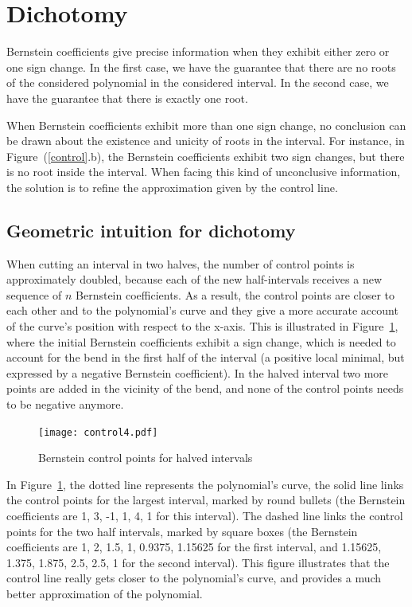 \documentclass{mscs}
\begin{document}
\section{Dichotomy}

\label{sec:dicho}
Bernstein coefficients give precise information when they exhibit
either zero or one sign change. In the first case, we have the
guarantee that there are no roots of the considered polynomial in the
considered interval. In the second case, we have the guarantee that
there is exactly one root.

When Bernstein coefficients exhibit more than one sign change, no
conclusion can be drawn about the existence and unicity of roots in the
interval.  For instance, in Figure~(\ref{control}.b), the Bernstein
coefficients exhibit two sign changes, but there is no root inside the
interval.  When facing this kind of unconclusive information, the solution
is to refine the approximation given by the control line.

\subsection{Geometric intuition for dichotomy}
\label{ssec:dichogeom}
When cutting an interval in two halves, the number of control points is
approximately doubled, because each of the new half-intervals receives a
new sequence of \(n\) Bernstein coefficients.  As a result, the control points
are closer to each other and to the polynomial's curve and they give a more
accurate account of the curve's position with respect to the x-axis.  This is
illustrated in Figure~\ref{dichotomy-curve}, where the initial Bernstein
coefficients exhibit a sign change, which is needed to account for the bend
in the first half of the interval (a positive local minimal, but expressed
by a negative Bernstein coefficient).  In the halved interval two more points
are added in the vicinity of the bend, and none of the control points needs
to be negative anymore.
\begin{figure}
\begin{center}
\texttt{[image: control4.pdf]}
\caption{\label{dichotomy-curve}Bernstein control points for halved intervals}
\end{center}
\end{figure}

In Figure~\ref{dichotomy-curve}, the dotted line represents
the polynomial's curve, the solid line links the control points for
the largest interval, marked by round bullets (the Bernstein coefficients are
1, 3, -1, 1, 4, 1 for this interval).  The dashed line links the control points
for the two half intervals, marked by square boxes
(the Bernstein coefficients are 1, 2, 1.5, 1,
0.9375, 1.15625 for the first interval, and 1.15625, 1.375, 1.875, 2.5, 2.5,
1 for the second interval).  This figure illustrates that the control line
really gets closer to the polynomial's curve, and provides a much better
approximation of the polynomial.
\end{document}
